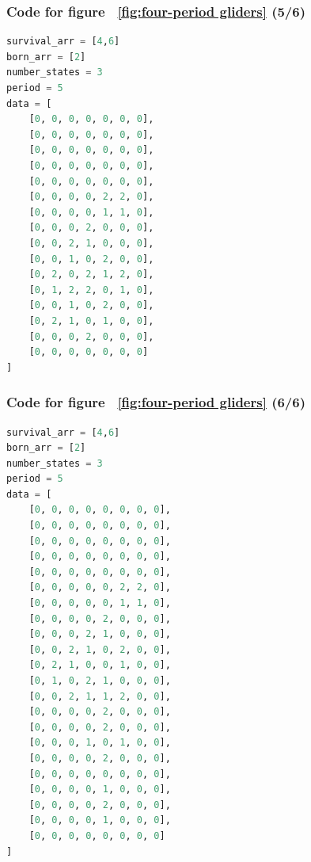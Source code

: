 \documentclass[12pt]{article}
\numberwithin{figure}{section} %
\begin{document}
\noindent\begin{minipage}{.45\textwidth}
\subsubsection{Code for figure ~\ref{fig:four-period gliders} (5/6)}
\label{subsubsection:four-period gliders(5/6)}
\begin{lstlisting}[language = Python]
survival_arr = [4,6]
born_arr = [2]
number_states = 3
period = 5
data = [
    [0, 0, 0, 0, 0, 0, 0],
    [0, 0, 0, 0, 0, 0, 0],
    [0, 0, 0, 0, 0, 0, 0],
    [0, 0, 0, 0, 0, 0, 0],
    [0, 0, 0, 0, 0, 0, 0],
    [0, 0, 0, 0, 2, 2, 0],
    [0, 0, 0, 0, 1, 1, 0],
    [0, 0, 0, 2, 0, 0, 0],
    [0, 0, 2, 1, 0, 0, 0],
    [0, 0, 1, 0, 2, 0, 0],
    [0, 2, 0, 2, 1, 2, 0],
    [0, 1, 2, 2, 0, 1, 0],
    [0, 0, 1, 0, 2, 0, 0],
    [0, 2, 1, 0, 1, 0, 0],
    [0, 0, 0, 2, 0, 0, 0],
    [0, 0, 0, 0, 0, 0, 0]
]
\end{lstlisting}
\end{minipage}\hfill
\begin{minipage}{.5\textwidth}
\subsubsection{Code for figure ~\ref{fig:four-period gliders} (6/6)}
\label{subsubsection:four-period gliders(6/6)}
\begin{lstlisting}[language = Python]
survival_arr = [4,6]
born_arr = [2]
number_states = 3
period = 5
data = [
    [0, 0, 0, 0, 0, 0, 0, 0],
    [0, 0, 0, 0, 0, 0, 0, 0],
    [0, 0, 0, 0, 0, 0, 0, 0],
    [0, 0, 0, 0, 0, 0, 0, 0],
    [0, 0, 0, 0, 0, 0, 0, 0],
    [0, 0, 0, 0, 0, 2, 2, 0],
    [0, 0, 0, 0, 0, 1, 1, 0],
    [0, 0, 0, 0, 2, 0, 0, 0],
    [0, 0, 0, 2, 1, 0, 0, 0],
    [0, 0, 2, 1, 0, 2, 0, 0],
    [0, 2, 1, 0, 0, 1, 0, 0],
    [0, 1, 0, 2, 1, 0, 0, 0],
    [0, 0, 2, 1, 1, 2, 0, 0],
    [0, 0, 0, 0, 2, 0, 0, 0],
    [0, 0, 0, 0, 2, 0, 0, 0],
    [0, 0, 0, 1, 0, 1, 0, 0],
    [0, 0, 0, 0, 2, 0, 0, 0],
    [0, 0, 0, 0, 0, 0, 0, 0],
    [0, 0, 0, 0, 1, 0, 0, 0],
    [0, 0, 0, 0, 2, 0, 0, 0],
    [0, 0, 0, 0, 1, 0, 0, 0],
    [0, 0, 0, 0, 0, 0, 0, 0]
]

\end{lstlisting}
\end{minipage}
\end{document}

